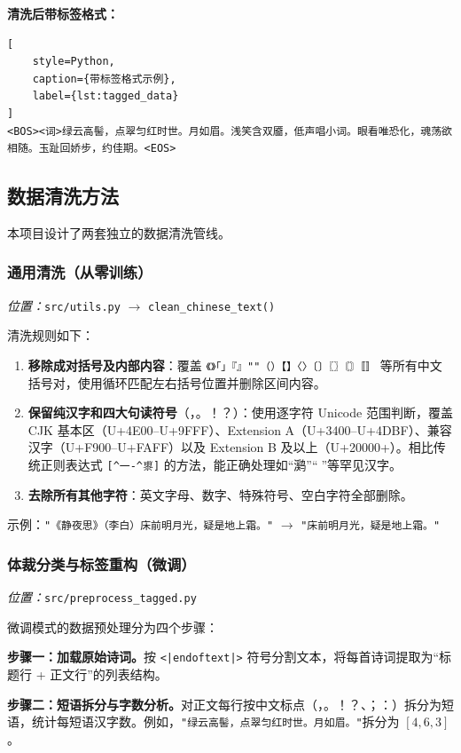 \documentclass[a4paper, 12pt, centering, AutoFakeBold]{article}
\begin{document}
\textbf{清洗后带标签格式：}
\begin{lstlisting}[
    style=Python,
    caption={带标签格式示例},
    label={lst:tagged_data}
]
<BOS><词>绿云高髻，点翠匀红时世。月如眉。浅笑含双靥，低声唱小词。眼看唯恐化，魂荡欲相随。玉趾回娇步，约佳期。<EOS>
\end{lstlisting}

\subsection{数据清洗方法}

本项目设计了两套独立的数据清洗管线。

\subsubsection{通用清洗（从零训练）}

\textit{位置：}\texttt{src/utils.py} $\to$ \texttt{clean\_chinese\_text()}

清洗规则如下：
\begin{enumerate}
    \item \textbf{移除成对括号及内部内容}：覆盖 \texttt{《》「」『』""（）【】〈〉〔〕〖〗〘〙〚〛} 等所有中文括号对，使用循环匹配左右括号位置并删除区间内容。
    \item \textbf{保留纯汉字和四大句读符号}（，。！？）：使用逐字符 Unicode 范围判断，覆盖 CJK 基本区（U+4E00--U+9FFF）、Extension A（U+3400--U+4DBF）、兼容汉字（U+F900--U+FAFF）以及 Extension B 及以上（U+20000+）。相比传统正则表达式 \texttt{[\^{}一-\^{}鿿]} 的方法，能正确处理如``㶉''``𫛶''等罕见汉字。
    \item \textbf{去除所有其他字符}：英文字母、数字、特殊符号、空白字符全部删除。
\end{enumerate}

示例：\texttt{"《静夜思》（李白）床前明月光，疑是地上霜。"} $\to$ \texttt{"床前明月光，疑是地上霜。"}

\subsubsection{体裁分类与标签重构（微调）}

\textit{位置：}\texttt{src/preprocess\_tagged.py}

微调模式的数据预处理分为四个步骤：

\textbf{步骤一：加载原始诗词。}按 \texttt{<|endoftext|>} 符号分割文本，将每首诗词提取为``标题行 + 正文行''的列表结构。

\textbf{步骤二：短语拆分与字数分析。}对正文每行按中文标点（，。！？、；：）拆分为短语，统计每短语汉字数。例如，\texttt{"绿云高髻，点翠匀红时世。月如眉。"}拆分为 $[4, 6, 3]$。
\end{document}
